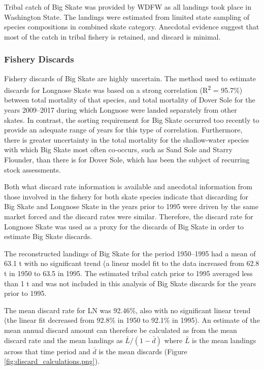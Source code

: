 \documentclass[12pt,]{article}
\begin{document}
Tribal catch of Big Skate was provided by WDFW as all landings took
place in Washington State. The landings were estimated from limited
state sampling of species compositions in combined skate category.
Anecdotal evidence suggest that most of the catch in tribal fishery is
retained, and discard is minimal.

\hypertarget{fishery-discards}{%
\subsubsection{Fishery Discards}\label{fishery-discards}}

Fishery discards of Big Skate are highly uncertain. The method used to
estimate discards for Longnose Skate was based on a strong correlation
(R\textsuperscript{2} = 95.7\%) between total mortality of that species,
and total mortality of Dover Sole for the years 2009--2017 during which
Longnose were landed separately from other skates. In contrast, the
sorting requirement for Big Skate occurred too recently to provide an
adequate range of years for this type of correlation. Furthermore, there
is greater uncertainty in the total mortality for the shallow-water
species with which Big Skate most often co-occurs, such as Sand Sole and
Starry Flounder, than there is for Dover Sole, which has been the
subject of recurring stock assessments.

Both what discard rate information is available and anecdotal
information from those involved in the fishery for both skate species
indicate that discarding for Big Skate and Longnose Skate in the years
prior to 1995 were driven by the same market forced and the discard
rates were similar. Therefore, the discard rate for Longnose Skate was
used as a proxy for the discards of Big Skate in order to estimate Big
Skate discards.

The reconstructed landings of Big Skate for the period 1950--1995 had a
mean of 63.1 t with no significant trend (a linear model fit to the data
increased from 62.8 t in 1950 to 63.5 in 1995. The estimated tribal
catch prior to 1995 averaged less than 1 t and was not included in this
analysis of Big Skate discards for the years prior to 1995.

The mean discard rate for LN was 92.46\%, also with no significant
linear trend (the linear fit decreased from 92.8\% in 1950 to 92.1\% in
1995). An estimate of the mean annual discard amount can therefore be
calculated as from the mean discard rate and the mean landings as
\(\bar{L} / (1 - \bar{d})\) where \(\bar{L}\) is the mean landings
across that time period and \(\bar{d}\) is the mean discards (Figure
\ref{fig:discard_calculations.png}).
\end{document}
